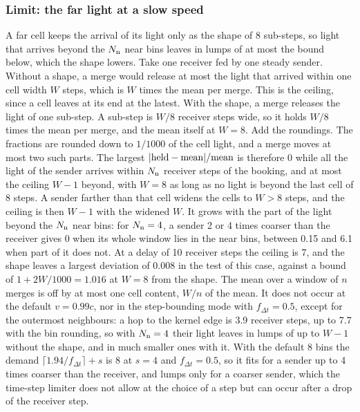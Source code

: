 \subsubsection{Limit: the far light at a slow speed}
\label{sec:isrf-far-limit}

A far cell keeps the arrival of its light only as the shape of $8$ sub-steps,
so light that arrives beyond the $N_{\rm n}$ near bins leaves in lumps of at
most the bound below, which the shape lowers. Take one
receiver fed by one steady sender. Without a shape, a merge would release at
most the light that arrived within one cell width $W$ steps, which is $W$ times
the mean per merge. This is the ceiling, since a cell leaves at
its end at the latest. With the shape, a merge releases the light of one
sub-step. A sub-step is $W/8$ receiver steps wide, so it holds $W/8$ times the
mean per merge, and the mean itself at $W=8$. Add the roundings. The fractions are rounded down
to $1/1000$ of the cell light, and a merge moves at most two such parts. The largest $|{\rm held}-{\rm mean}|/{\rm mean}$ is therefore 0 while
all the light of the sender arrives within $N_{\rm n}$ receiver steps of the booking,
and at most the ceiling $W-1$ beyond, with $W=8$ as long as no light is beyond the last
cell of $8$ steps. A sender farther than that cell widens the cells to $W>8$
steps, and the ceiling is then $W-1$ with the widened $W$. It grows with the part
of the light beyond the $N_{\rm n}$ near bins: for $N_{\rm n}=4$, a sender 2 or 4 times coarser than the receiver gives 0 when its
whole window lies in the near bins, between 0.15 and 6.1 when part of it does
not. At a delay of 10 receiver steps the ceiling is 7, and the shape leaves a
largest deviation of 0.008 in the test of this case, against a bound of
$1+2W/1000=1.016$ at $W=8$ from the shape. The mean over a window of $n$ merges is
off by at most one cell content, $W/n$ of the mean. It does not occur at the
default $v=0.99c$, nor in the step-bounding mode with $f_{\Delta t}=0.5$,
except for the outermost neighbours: a hop to the kernel edge is 3.9 receiver
steps, up to 7.7 with the bin rounding, so with $N_{\rm n}=4$ their light
leaves in lumps of up to $W-1$ without the shape, and in much smaller ones with it. With the default 8 bins the demand
$\lceil 1.94/f_{\Delta t}\rceil+s$ is 8 at $s=4$ and $f_{\Delta t}=0.5$, so
it fits for a sender up to 4 times coarser than the receiver, and lumps only
for a coarser sender, which the time-step limiter does not allow at the choice
of a step but can occur after a drop of the receiver step.

